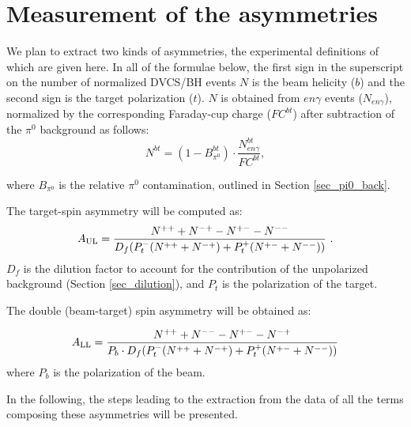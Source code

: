 \section{Measurement of the asymmetries}
We plan to extract two kinds of asymmetries, the experimental definitions of which are given here. In all of the formulae below, the first sign in the superscript on the number of normalized DVCS/BH events $N$ is the beam helicity ($b$) and the second sign
is the target polarization ($t$).
$N$ is obtained from $en\gamma$ events ($N_{en\gamma}$), normalized by the corresponding Faraday-cup charge ($FC^{bt}$) after subtraction of the $\pi^0$ background as follows:
\begin{equation}
N^{bt}= (1-B_{\pi^0}^{bt})\cdot \frac{N^{bt}_{en\gamma}}{FC^{bt}},
\end{equation}

where $B_{\pi^0}$ is the relative $\pi^0$ contamination, outlined in Section \ref{sec_pi0_back}. 

The target-spin asymmetry will be computed as:
\begin{equation}\label{def_tsa}
A_{\rm UL} = \frac{N^{++}+N^{-+}-N^{+-}-N^{--}}{D_f (P_t^-(N^{++}+N^{-+})+P_t^+(N^{+-}+N^{--}))}~.
\end{equation}
 $D_f$ is the dilution factor to account for the contribution of the unpolarized background (Section \ref{sec_dilution}), and $P_t$ is the polarization of the target. 

The double (beam-target) spin asymmetry will be obtained as:

\begin{equation}\label{def_dsa}
A_{\rm LL} = \frac{N^{++}+N^{--}-N^{+-}-N^{-+}}{P_b\cdot D_f (P_t^-(N^{++}+N^{-+})+P_t^+(N^{+-}+N^{--}))}
\end{equation}
where $P_b$ is the polarization of the beam.

In the following, the steps leading to the extraction from the data of all the terms composing these asymmetries will be presented. 

